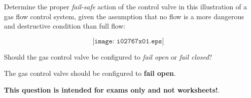 

Determine the proper {\it fail-safe} action of the control valve in this illustration of a gas flow control system, given the assumption that no flow is a more dangerous and destructive condition than full flow:

$$\texttt{[image: i02767x01.eps]}$$

Should the gas control valve be configured to {\it fail open} or {\it fail closed}?







The gas control valve should be configured to {\bf fail open}.







{\bf This question is intended for exams only and not worksheets!}.



